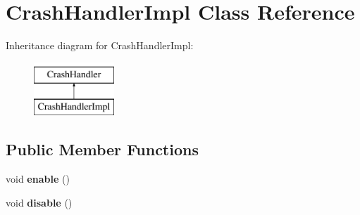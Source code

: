 \hypertarget{class_crash_handler_impl}{
\section{CrashHandlerImpl Class Reference}
\label{class_crash_handler_impl}
}
Inheritance diagram for CrashHandlerImpl:\begin{figure}[H]
\begin{center}
\leavevmode
\includegraphics[height=2cm]{class_crash_handler_impl}
\end{center}
\end{figure}
\subsection*{Public Member Functions}
\begin{DoxyCompactItemize}
\item 
\hypertarget{class_crash_handler_impl_a31802b6b333918c101012aba4fa929fa}{
void {\bfseries enable} ()}
\label{class_crash_handler_impl_a31802b6b333918c101012aba4fa929fa}

\item 
\hypertarget{class_crash_handler_impl_a8b0827b38959004a1ca628c36c29a09e}{
void {\bfseries disable} ()}
\label{class_crash_handler_impl_a8b0827b38959004a1ca628c36c29a09e}

\end{DoxyCompactItemize}
